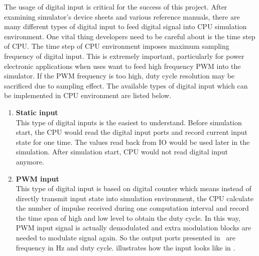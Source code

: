 The usage of digital input is critical for the success of this project. After examining simulator's device sheets and various reference manuals, there are many different types of digital input to feed digital signal into \gls{CPU} simulation environment. One vital thing developers need to be careful about is the time step of \gls{CPU}. The time step of \gls{CPU} environment imposes maximum sampling frequency of digital input. This is extremely important, particularly for power electronic applications when uses want to feed high frequency \gls{PWM} into the simulator. If the \gls{PWM} frequency is too high, duty cycle resolution may be sacrificed due to sampling effect. The available types of digital input which can be implemented in \gls{CPU} environment are listed below. 
\begin{enumerate}
\item \textbf{Static input} \\
This type of digital inputs is the easiest to understand. Before simulation start, the \gls{CPU} would read the digital input ports and record current input state for one time. The values read back from IO would be used later in the simulation. After simulation start, \gls{CPU} would not read digital input anymore. 
\item \textbf{PWM input} \\
This type of digital input is based on digital counter which means instead of directly transmit input state into simulation environment, the \gls{CPU} calculate the number of impulse received during one computation interval and record the time span of high and low level to obtain the duty cycle. In this way, \gls{PWM} input signal is actually demodulated and extra modulation blocks are needed to modulate signal again. So the output ports presented in \simulink~are frequency in Hz and duty cycle.  illustrates how the input looks like in \simulink.


\end{enumerate}
